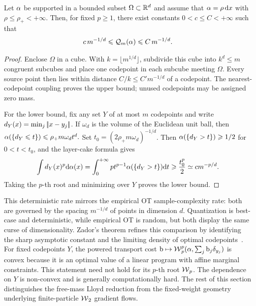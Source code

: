 \begin{prop}\label{prop-quantization-rate}
	Let $\alpha$ be supported in a bounded subset $\Omega\subset\mathbb{R}^d$ and assume that $\alpha=\rho\,\mathrm{d} x$ with $\rho\leq\rho_+<+\infty$. Then, for fixed $p\geq1$, there exist constants $0<c\leq C<+\infty$ such that
	\[
		c\,m^{-1/d}
		\leqslant
		\mathcal{Q}_m(\alpha)
		\leqslant
		C\,m^{-1/d}.
	\]
\end{prop}
\begin{proof}
	Enclose $\Omega$ in a cube. With $k=\lfloor m^{1/d}\rfloor$, subdivide this cube into $k^d\leq m$ congruent subcubes and place one codepoint in each subcube meeting $\Omega$. Every source point then lies within distance $C/k\leq C'm^{-1/d}$ of a codepoint. The nearest-codepoint coupling proves the upper bound; unused codepoints may be assigned zero mass.

	For the lower bound, fix any set $Y$ of at most $m$ codepoints and write $d_Y(x)=\min_j|\!| x-y_j |\!|$. If $\omega_d$ is the volume of the Euclidean unit ball, then
	\(
	\alpha(\{d_Y\leqslant t\})\leqslant \rho_+m\omega_dt^d.
	\)
	Set $t_0=(2\rho_+m\omega_d)^{-1/d}$. Then $\alpha(\{d_Y>t\})\geqslant1/2$ for $0<t<t_0$, and the layer-cake formula gives
	\[
		\int d_Y(x)^p\mathrm{d}\alpha(x)
		=
		\int_0^{+\infty} p t^{p-1}\alpha(\{d_Y>t\})\mathrm{d} t
		\geqslant
		\frac{t_0^p}{2}
		\simeq
		c m^{-p/d}.
	\]
	Taking the $p$-th root and minimizing over $Y$ proves the lower bound.
\end{proof}

This deterministic rate mirrors the empirical OT sample-complexity rate: both are governed by the spacing $m^{-1/d}$ of points in dimension $d$. Quantization is best-case and deterministic, while empirical OT is random, but both display the same curse of dimensionality. Zador's theorem refines this comparison by identifying the sharp asymptotic constant and the limiting density of optimal codepoints~\cite{graf2000foundationsquantization}.
For fixed codepoints $Y$, the powered transport cost
\(
\mathrm{b}\mapsto\operatorname{\mathcal{W}}_p^p(\alpha,\sum_j\mathrm{b}_j\delta_{y_j})
\)
is convex because it is an optimal value of a linear program with affine marginal constraints. This statement need not hold for its $p$-th root $\operatorname{\mathcal{W}}_p$. The dependence on $Y$ is non-convex and is generally computationally hard. The rest of this section distinguishes the free-mass Lloyd reduction from the fixed-weight geometry underlying finite-particle $\operatorname{\mathcal{W}}_2$ gradient flows.

